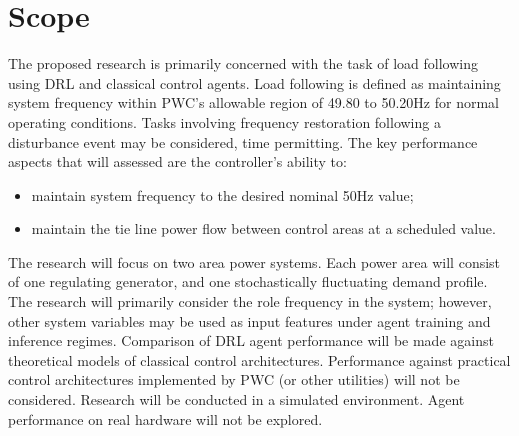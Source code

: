 \section{Scope}
The proposed research is primarily concerned with the task of load following using DRL and classical control agents. Load following is defined as maintaining system frequency within PWC's allowable region of 49.80 to 50.20$\si{\hertz}$ for normal operating conditions. Tasks involving frequency restoration following a disturbance event may be considered, time permitting. The key performance aspects that will assessed are the controller's ability to:
\begin{itemize}
	\item maintain system frequency to the desired nominal 50$\si{\hertz}$ value;
	\item maintain the tie line power flow between control areas at a scheduled value.
\end{itemize}

The research will focus on two area power systems. Each power area will consist of one regulating generator, and one stochastically fluctuating demand profile. The research will primarily consider the role frequency in the system; however, other system variables may be used as input features under agent training and inference regimes. Comparison of DRL agent performance will be made against theoretical models of classical control architectures. Performance against practical control architectures implemented by PWC (or other utilities) will not be considered. Research will be conducted in a simulated environment. Agent performance on real hardware will not be explored.